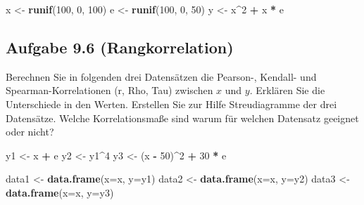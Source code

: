 \documentclass[
]{article}
\newenvironment{Shaded}{\begin{snugshade}}{\end{snugshade}}
\newcommand{\AttributeTok}[1]{\textcolor[rgb]{0.13,0.29,0.53}{#1}}
\newcommand{\DecValTok}[1]{\textcolor[rgb]{0.00,0.00,0.81}{#1}}
\newcommand{\FunctionTok}[1]{\textcolor[rgb]{0.13,0.29,0.53}{\textbf{#1}}}
\newcommand{\NormalTok}[1]{#1}
\newcommand{\OtherTok}[1]{\textcolor[rgb]{0.56,0.35,0.01}{#1}}
\newcommand{\SpecialCharTok}[1]{\textcolor[rgb]{0.81,0.36,0.00}{\textbf{#1}}}
\begin{document}
\begin{Shaded}
\begin{Highlighting}[]
\NormalTok{x }\OtherTok{\textless{}{-}} \FunctionTok{runif}\NormalTok{(}\DecValTok{100}\NormalTok{, }\DecValTok{0}\NormalTok{, }\DecValTok{100}\NormalTok{)}
\NormalTok{e }\OtherTok{\textless{}{-}} \FunctionTok{runif}\NormalTok{(}\DecValTok{100}\NormalTok{, }\DecValTok{0}\NormalTok{, }\DecValTok{50}\NormalTok{)}
\NormalTok{y }\OtherTok{\textless{}{-}}\NormalTok{ x}\SpecialCharTok{\^{}}\DecValTok{2} \SpecialCharTok{+}\NormalTok{ x }\SpecialCharTok{*}\NormalTok{ e}
\end{Highlighting}
\end{Shaded}

\hypertarget{aufgabe-9.6-rangkorrelation}{%
\subsection{Aufgabe 9.6
(Rangkorrelation)}\label{aufgabe-9.6-rangkorrelation}}

Berechnen Sie in folgenden drei Datensätzen die Pearson-, Kendall- und
Spearman-Korrelationen (r, Rho, Tau) zwischen \(x\) und \(y\). Erklären
Sie die Unterschiede in den Werten. Erstellen Sie zur Hilfe
Streudiagramme der drei Datensätze. Welche Korrelationsmaße sind warum
für welchen Datensatz geeignet oder nicht?

\begin{Shaded}
\begin{Highlighting}[]
\NormalTok{y1 }\OtherTok{\textless{}{-}}\NormalTok{ x }\SpecialCharTok{+}\NormalTok{ e}
\NormalTok{y2 }\OtherTok{\textless{}{-}}\NormalTok{ y1}\SpecialCharTok{\^{}}\DecValTok{4}
\NormalTok{y3 }\OtherTok{\textless{}{-}}\NormalTok{ (x }\SpecialCharTok{{-}} \DecValTok{50}\NormalTok{)}\SpecialCharTok{\^{}}\DecValTok{2} \SpecialCharTok{+} \DecValTok{30} \SpecialCharTok{*}\NormalTok{ e}

\NormalTok{data1 }\OtherTok{\textless{}{-}} \FunctionTok{data.frame}\NormalTok{(}\AttributeTok{x=}\NormalTok{x, }\AttributeTok{y=}\NormalTok{y1)}
\NormalTok{data2 }\OtherTok{\textless{}{-}} \FunctionTok{data.frame}\NormalTok{(}\AttributeTok{x=}\NormalTok{x, }\AttributeTok{y=}\NormalTok{y2)}
\NormalTok{data3 }\OtherTok{\textless{}{-}} \FunctionTok{data.frame}\NormalTok{(}\AttributeTok{x=}\NormalTok{x, }\AttributeTok{y=}\NormalTok{y3)}
\end{Highlighting}
\end{Shaded}
\end{document}
